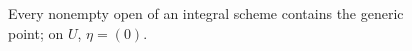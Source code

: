 \begin{figure}[htbp]\centering
{}
\caption{Every nonempty open of an integral scheme contains the generic point; on $U$, $\eta=(0)$.}\label{fig:vi27-generic}\end{figure}
